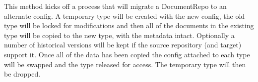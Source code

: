 This method kicks off a process that will migrate a DocumentRepo to an alternate config. A temporary type will be created with the new config,
 the old type will be locked for modifications and then all of the documents in the existing type will be copied to the new type, with the metadata intact.
 Optionally a number of historical versions will be kept if the source repository (and target) support it. Once all of the data has been copied the config
 attached to each type will be swapped and the type released for access. The temporary type will then be dropped.
